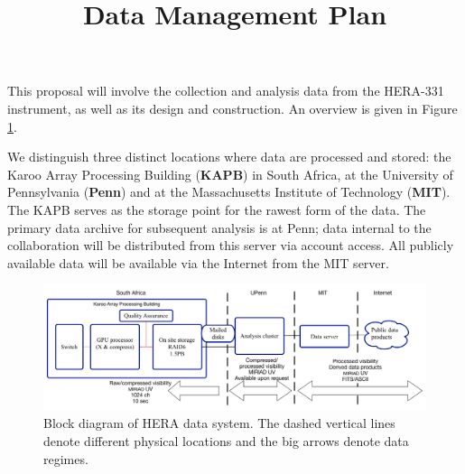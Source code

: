 \documentclass[preprint]{aastex}
\begin{document}
\title{Data Management Plan}

% 
% 

% 
% 
%




This proposal will involve the collection and analysis data from the HERA-331 instrument, as well as its design and construction.  An overview is given in Figure \ref{fig:dmpBlock}.

We distinguish three distinct locations where data are processed and stored: the Karoo Array Processing Building ({\bf KAPB}) in South Africa, at the University of Pennsylvania ({\bf Penn}) and at the Massachusetts Institute of Technology ({\bf MIT}).  The KAPB serves as the storage point for the rawest form of the data.  The primary data archive for subsequent analysis is at Penn;  data internal to the collaboration will be distributed from this server via account access.  All publicly available data will be available via the Internet from the MIT server. 

\begin{figure}[h]
\includegraphics[width=\textwidth]{plots/Engineering/dataMgmtBlock.png}
\caption{Block diagram of HERA data system.  The dashed vertical lines denote different physical locations and the big arrows denote data regimes.}
\label{fig:dmpBlock}
\end{figure}
\end{document}
